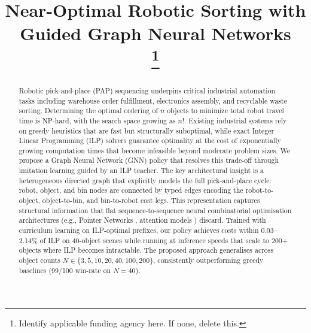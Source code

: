 \documentclass[conference]{IEEEtran}
\begin{document}
\title{\textbf{Near-Optimal Robotic Sorting with Guided Graph Neural Networks}\\
\thanks{Identify applicable funding agency here. If none, delete this.}
}

\author{
\and
{}
\and
{}
}

\maketitle

\begin{abstract}
Robotic pick-and-place (PAP) sequencing underpins critical industrial automation tasks including warehouse order fulfillment, electronics assembly, and recyclable waste sorting. Determining the optimal ordering of $n$ objects to minimize total robot travel time is NP-hard, with the search space growing as $n!$. Existing industrial systems rely on greedy heuristics that are fast but structurally suboptimal, while exact Integer Linear Programming (ILP) solvers guarantee optimality at the cost of exponentially growing computation times that become infeasible beyond moderate problem sizes. We propose a Graph Neural Network (GNN) policy that resolves this trade-off through imitation learning guided by an ILP teacher. The key architectural insight is a heterogeneous directed graph that explicitly models the full pick-and-place cycle: robot, object, and bin nodes are connected by typed edges encoding the robot-to-object, object-to-bin, and bin-to-robot cost legs. This representation captures structural information that flat sequence-to-sequence neural combinatorial optimisation architectures (e.g., Pointer Networks \cite{vinyals2015pointer}, attention models \cite{kool2019attention}) discard. Trained with curriculum learning on ILP-optimal prefixes, our policy achieves costs within 0.03--2.14\% of ILP on 40-object scenes while running at inference speeds that scale to 200+ objects where ILP becomes intractable. The proposed approach generalises across object counts $N \in \{3, 5, 10, 20, 40, 100, 200\}$, consistently outperforming greedy baselines (99/100 win-rate on $N{=}40$).
\end{abstract}
\end{document}
